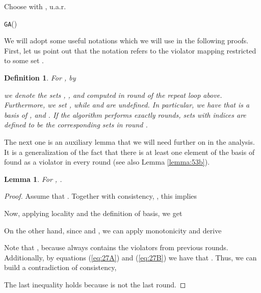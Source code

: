 \documentclass[12pt]{article}
\newtheorem{lemma2}[theorem2]{Lemma}
\newenvironment{lemma}{\begin{lemma2}}{\end{lemma2}}
\newtheorem{definition2}[theorem2]{Definition}
\newenvironment{definition}{\begin{definition2}}{\end{definition2}}
\theoremstyle{remark}
\def\stageI{\texttt{GA}}
\def\stageII{\texttt{SA}}
\begin{document}
\begin{algorithm}[H]

	\Indp
	\SetInd{0.5cm}{0em}
	\BlankLine
			\;
			Choose  with ,  u.a.r.\;
			\;
			
			\Repeat{}{
				 \stageII()\;
				\;
		}
		\Return{}
	\BlankLine
    \caption{\stageI()\label{alg:stageI}}
    \end{algorithm}
    
    We will adopt some useful notations which we will use in the following proofs.
    First, let us point out that the notation  refers to the violator mapping
restricted to some set .
    \begin{definition}
    \label{def:intermediatesets}
    For , by
    
    we denote the sets , , and  computed in round  of the
    repeat loop above.
    Furthermore, we set , while 
    and   are undefined. In particular, we have that
    is a basis of , and  .
    If the algorithm performs exactly  rounds, sets with indices  are defined
    to be the corresponding sets in round .
    \end{definition}
    
    
    The next one is an auxiliary lemma that we will need further on in the analysis. It is a 
generalization
    of the fact that there is at least one element of the basis of  found as a violator in every 
round (see also
    Lemma \ref{lemma:53b}).
    \begin{lemma}
    \label{lemma:53}
    	For , .
    \end{lemma}
    \begin{proof}
    Assume that . Together with consistency,
    , this implies
    
   Now, applying locality and the definition of basis, we get
   
   On the other  hand, since  and
   ,
   we can apply monotonicity and derive
   
   Note that , because  always contains the
   violators from previous rounds. Additionally, by equations (\ref{eq:27A}) and (\ref{eq:27B}) we have 
that
   .
   Thus, we can build a contradiction of consistency,
   
   The last inequality holds because  is not the last round.
    \end{proof}
    
\end{document}
